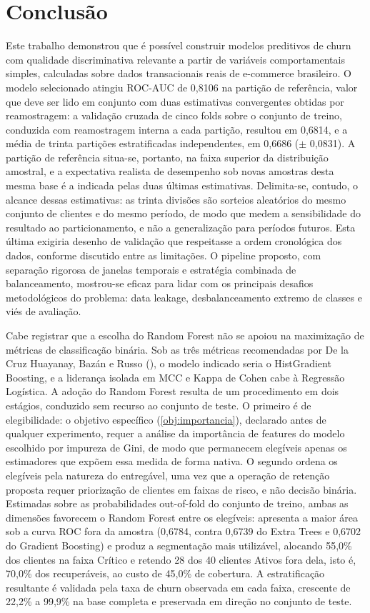 \chapter{Conclusão} \label{Cap:Conclusao}

Este trabalho demonstrou que é possível construir modelos preditivos de churn com qualidade discriminativa relevante a partir de variáveis comportamentais simples, calculadas sobre dados transacionais reais de e-commerce brasileiro. O modelo selecionado atingiu ROC-AUC de 0,8106 na partição de referência, valor que deve ser lido em conjunto com duas estimativas convergentes obtidas por reamostragem: a validação cruzada de cinco folds sobre o conjunto de treino, conduzida com reamostragem interna a cada partição, resultou em 0,6814, e a média de trinta partições estratificadas independentes, em 0,6686 ($\pm$ 0,0831). A partição de referência situa-se, portanto, na faixa superior da distribuição amostral, e a expectativa realista de desempenho sob novas amostras desta mesma base é a indicada pelas duas últimas estimativas. Delimita-se, contudo, o alcance dessas estimativas: as trinta divisões são sorteios aleatórios do mesmo conjunto de clientes e do mesmo período, de modo que medem a sensibilidade do resultado ao particionamento, e não a generalização para períodos futuros. Esta última exigiria desenho de validação que respeitasse a ordem cronológica dos dados, conforme discutido entre as limitações. O pipeline proposto, com separação rigorosa de janelas temporais e estratégia combinada de balanceamento, mostrou-se eficaz para lidar com os principais desafios metodológicos do problema: data leakage, desbalanceamento extremo de classes e viés de avaliação.

Cabe registrar que a escolha do Random Forest não se apoiou na maximização de métricas de classificação binária. Sob as três métricas recomendadas por De la Cruz Huayanay, Bazán e Russo (\citeyear{delacruz2025}), o modelo indicado seria o HistGradient Boosting, e a liderança isolada em MCC e Kappa de Cohen cabe à Regressão Logística. A adoção do Random Forest resulta de um procedimento em dois estágios, conduzido sem recurso ao conjunto de teste. O primeiro é de elegibilidade: o objetivo específico (\ref{obj:importancia}), declarado antes de qualquer experimento, requer a análise da importância de features do modelo escolhido por impureza de Gini, de modo que permanecem elegíveis apenas os estimadores que expõem essa medida de forma nativa. O segundo ordena os elegíveis pela natureza do entregável, uma vez que a operação de retenção proposta requer priorização de clientes em faixas de risco, e não decisão binária. Estimadas sobre as probabilidades out-of-fold do conjunto de treino, ambas as dimensões favorecem o Random Forest entre os elegíveis: apresenta a maior área sob a curva ROC fora da amostra (0,6784, contra 0,6739 do Extra Trees e 0,6702 do Gradient Boosting) e produz a segmentação mais utilizável, alocando 55,0\% dos clientes na faixa Crítico e retendo 28 dos 40 clientes Ativos fora dela, isto é, 70,0\% dos recuperáveis, ao custo de 45,0\% de cobertura. A estratificação resultante é validada pela taxa de churn observada em cada faixa, crescente de 22,2\% a 99,9\% na base completa e preservada em direção no conjunto de teste.

